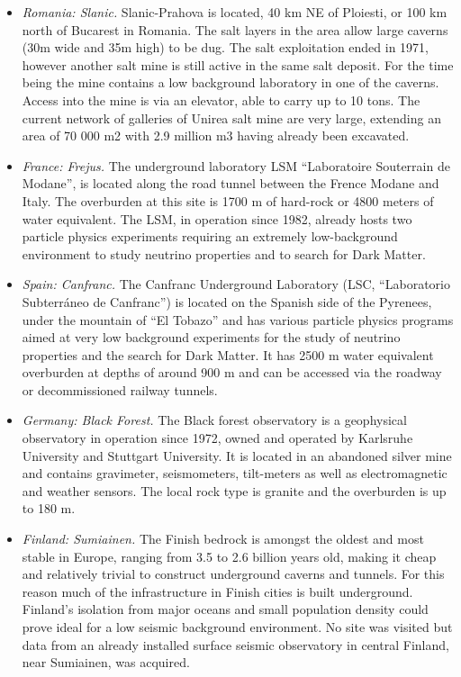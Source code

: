 \begin{itemize}
\item \emph{Romania: Slanic.}
Slanic-Prahova is located, 40 km NE of Ploiesti, or 100 km north of Bucarest in Romania. The salt layers in the area allow large caverns (30m wide and 35m high) to be dug. The salt exploitation ended in 1971, however another salt mine is still active in the same salt deposit. For the time being the mine contains a low background laboratory in one of the caverns. Access into the mine is via an elevator, able to carry up to 10 tons. The current network of galleries of Unirea salt mine are very large, extending an area of 70 000 m2 with 2.9 million m3 having already been excavated. 

\item \emph{France: Frejus.}
The underground laboratory LSM ``Laboratoire Souterrain de Modane'', is located along the road tunnel between the Frence Modane and Italy. The overburden at this site is 1700 m of hard-rock or 4800 meters of water equivalent. The LSM, in operation since 1982, already hosts two particle physics experiments requiring an extremely low-background environment to study neutrino properties and to search for Dark Matter.

\item \emph{Spain: Canfranc.}
The Canfranc Underground Laboratory (LSC, ``Laboratorio Subterr\'aneo de Canfranc'') is located on the Spanish side of the Pyrenees, under the mountain of ``El Tobazo'' and has various particle physics programs aimed at very low background experiments for the study of neutrino properties and the search for Dark Matter. It has 2500 m water equivalent overburden at depths of around 900 m and can be accessed via the roadway or decommissioned railway tunnels.

\item \emph{Germany: Black Forest.}
The Black forest observatory is a geophysical observatory in operation since 1972, owned and operated by Karlsruhe University and Stuttgart University. It is located in an abandoned silver mine and contains gravimeter, seismometers, tilt-meters as well as electromagnetic and weather sensors. The local rock type is granite and the overburden is up to 180 m.

\item \emph{Finland: Sumiainen.}
The Finish bedrock is amongst the oldest and most stable in Europe, ranging from 3.5 to 2.6 billion years old, making it cheap and relatively trivial to construct underground caverns and tunnels. For this reason much of the infrastructure in Finish cities is built underground. Finland's isolation from major oceans and small population density could prove ideal for a low seismic background environment. No site was visited but data from an already installed surface seismic observatory in central Finland, near Sumiainen, was acquired.


\end{itemize}
